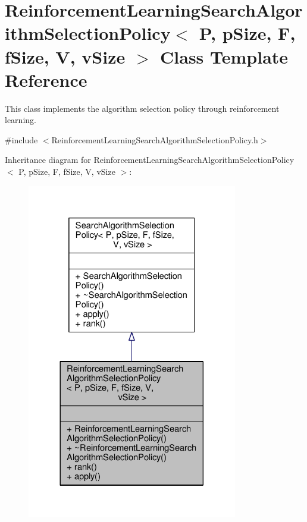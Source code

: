 \hypertarget{classReinforcementLearningSearchAlgorithmSelectionPolicy}{}\section{Reinforcement\+Learning\+Search\+Algorithm\+Selection\+Policy$<$ P, p\+Size, F, f\+Size, V, v\+Size $>$ Class Template Reference}
\label{classReinforcementLearningSearchAlgorithmSelectionPolicy}


This class implements the algorithm selection policy through reinforcement learning.  




{\ttfamily \#include $<$Reinforcement\+Learning\+Search\+Algorithm\+Selection\+Policy.\+h$>$}



Inheritance diagram for Reinforcement\+Learning\+Search\+Algorithm\+Selection\+Policy$<$ P, p\+Size, F, f\+Size, V, v\+Size $>$\+:\nopagebreak
\begin{figure}[H]
\begin{center}
\leavevmode
\includegraphics[width=260pt]{classReinforcementLearningSearchAlgorithmSelectionPolicy__inherit__graph}
\end{center}
\end{figure}


